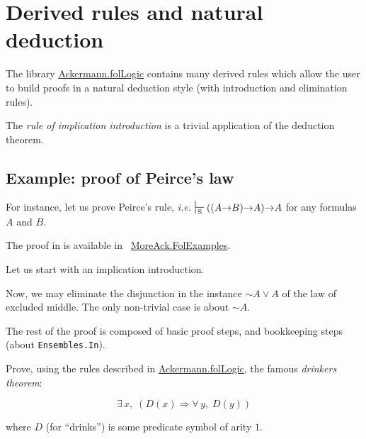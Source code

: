 \section{Derived rules and natural deduction}


 The library 
 \href{../theories/html/hydras.Ackermann.folLogic.html}{Ackermann.folLogic} contains many derived rules which allow the user to build proofs in a natural deduction style (with introduction and elimination rules).


The \emph{rule of implication introduction} is a trivial application of the deduction theorem.





\subsection{Example: proof of Peirce's law}

For instance, let us prove Peirce's rule, \emph{i.e.}
$\sdash ((A \arrow B) \arrow A) \arrow A$ for any formulas $A$ and $B$.

 The proof in \coq is available in  ~\href{../theories/html/hydras.MoreAck.FolExamples.html}{MoreAck.FolExamples}.


Let us start with  an implication introduction.


Now, we may eliminate the disjunction 
in the instance $\sim A \vee A$ of the law of excluded middle.
The only non-trivial case is about $\sim A$.


The rest of the proof is composed of basic proof steps, 
and bookkeeping steps (about \texttt{Ensembles.In}).


\begin{exercise}
Prove, using the rules described in 
 \href{../theories/html/hydras.Ackermann.folLogic.html}{Ackermann.folLogic}, the famous \emph{drinkers theorem}:

$$\exists\,x,\; (D(x)\Longrightarrow \forall\,y,\; D(y))$$
\end{exercise}

where $D$ (for ``drinks'') is some predicate symbol of arity $1$.


